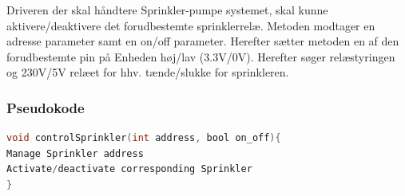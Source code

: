 Driveren der skal håndtere Sprinkler-pumpe systemet, skal kunne aktivere/deaktivere det forudbestemte sprinklerrelæ. Metoden modtager en adresse parameter samt en on/off parameter. Herefter sætter metoden en af den forudbestemte pin på Enheden høj/lav (3.3V/0V). Herefter søger relæstyringen og 230V/5V relæet for hhv. tænde/slukke for sprinkleren. 


\subsubsection*{Pseudokode}

\begin{lstlisting}[language=C]
void controlSprinkler(int address, bool on_off){
Manage Sprinkler address
Activate/deactivate corresponding Sprinkler
}
\end{lstlisting}





 